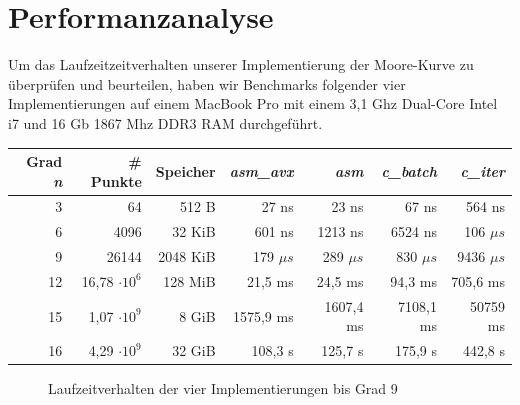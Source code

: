 \documentclass[course=erap]{aspdoc}
\begin{document}
\FloatBarrier
\section{Performanzanalyse}
Um das Laufzeitzeitverhalten unserer Implementierung der Moore-Kurve zu überprüfen und beurteilen, haben wir Benchmarks folgender vier Implementierungen auf einem MacBook Pro mit einem 3,1 Ghz Dual-Core Intel i7 und 16 Gb 1867 Mhz DDR3 RAM durchgeführt.

\begin{center}
    \begin{tabular}{| r | r | r | r | r | r | r |}
    \hline
    Grad \textit{n} & \# Punkte & Speicher & \textit{asm\_avx} & \textit{asm} & \textit{c\_batch} & \textit{c\_iter}  \\ \hline
    3 & 64 & 512 B  & 27 ns & 23 ns & 67 ns & 564 ns \\  \hline
    6 & 4096 & 32 KiB  & 601 ns & 1213 ns & 6524 ns & 106 $\mu s$ \\  \hline
    9 & 26144 & 2048 KiB  & 179 $\mu s$ & 289 $\mu s$ & 830 $\mu s$ & 9436 $\mu s$  \\  \hline
    12 & 16,78 $\cdot 10^6$ & 128 MiB & 21,5 ms & 24,5 ms & 94,3 ms & 705,6 ms \\ \hline
    15 & 1,07 $\cdot 10^9$ & 8 GiB & 1575,9 ms & 1607,4 ms & 7108,1 ms & 50759 ms \\ \hline
    16 & 4,29 $\cdot 10^9$ & 32 GiB & 108,3 s & 125,7 s & 175,9 s & 442,8 s \\ \hline
    \end{tabular}
\end{center}

\begin{figure}[htbp] 
    \centering
    \qquad
    \caption{Laufzeitverhalten der vier Implementierungen bis Grad 9}%
    \label{fig:Laufzeitvergleich}%
 \end{figure}
 
\end{document}
